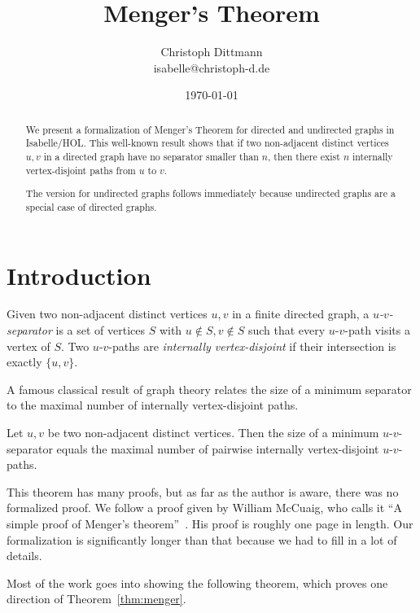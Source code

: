 \documentclass[11pt,a4paper,DIV=11]{scrartcl}
\begin{document}
\title{Menger's Theorem}
\author{Christoph Dittmann\\isabelle@christoph-d.de}
\date{\today}
\maketitle

\begin{abstract}
  We present a formalization of Menger's Theorem for directed and
  undirected graphs in Isabelle/HOL.  This well-known result shows
  that if two non-adjacent distinct vertices $u,v$ in a directed graph
  have no separator smaller than $n$, then there exist $n$ internally
  vertex-disjoint paths from $u$ to $v$.

  The version for undirected graphs follows immediately because
  undirected graphs are a special case of directed graphs.
\end{abstract}

\tableofcontents
\newpage

\section{Introduction}

Given two non-adjacent distinct vertices $u, v$ in a finite directed
graph, a \emph{$u$-$v$-separator} is a set of vertices $S$ with $u
\notin S, v \notin S$ such that every $u$-$v$-path visits a vertex of
$S$.  Two $u$-$v$-paths are \emph{internally vertex-disjoint} if their
intersection is exactly $\{u,v\}$.

A famous classical result of graph theory relates the size of a
minimum separator to the maximal number of internally vertex-disjoint
paths.

\begin{theorem}\label{thm:menger}
  Let $u,v$ be two non-adjacent distinct vertices. Then the size of a
  minimum $u$-$v$-separator equals the maximal number of pairwise
  internally vertex-disjoint $u$-$v$-paths.
\end{theorem}

This theorem has many proofs, but as far as the author is aware, there
was no formalized proof.  We follow a proof given by William McCuaig,
who calls it ``A simple proof of Menger's
theorem''~\cite{DBLP:journals/jgt/McCuaig84}.  His proof is roughly
one page in length.  Our formalization is significantly longer than
that because we had to fill in a lot of details.

Most of the work goes into showing the following theorem, which proves
one direction of Theorem~\ref{thm:menger}.
\end{document}
